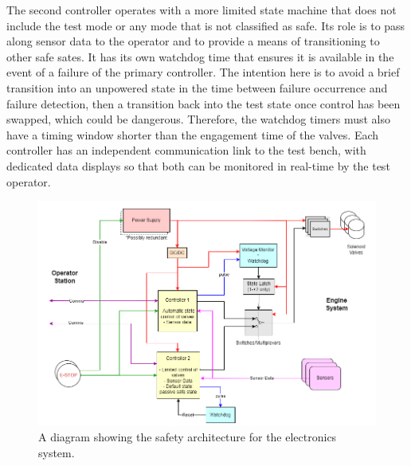         The second controller operates with a more limited state machine that does not include the test mode or any mode that is not classified as safe. Its role is to pass along sensor data to the operator and to provide a means of transitioning to other safe sates. It has its own watchdog time that ensures it is available in the event of a failure of the primary controller. The intention here is to avoid a brief transition into an unpowered state in the time between failure occurrence and failure detection, then a transition back into the test state once control has been swapped, which could be dangerous. Therefore, the watchdog timers must also have a timing window shorter than the engagement time of the valves. Each controller has an independent communication link to the test bench, with dedicated data displays so that both can be monitored in real-time by the test operator.

        \begin{figure}
            \centering
            \includegraphics[width=1\textwidth]{figures/Electronics_Safety_Architecture_Draft2.png}
            \caption{A diagram showing the safety architecture for the electronics system.}
            \label{fig:safe_elec}
        \end{figure}

